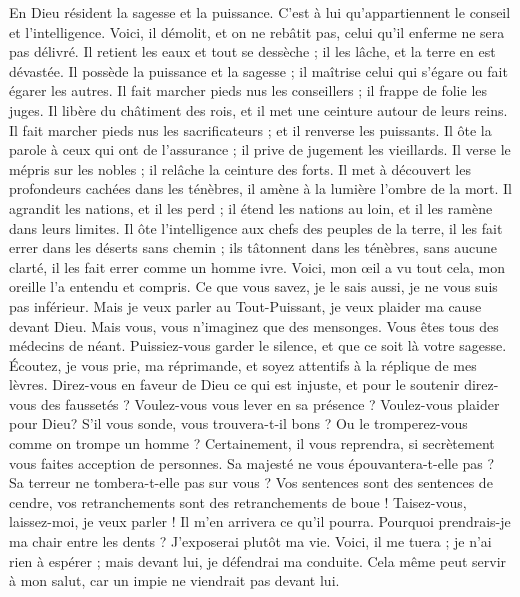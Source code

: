 \begin{multicols}{2}
En Dieu résident la sagesse et la puissance. C'est à lui qu'appartiennent le conseil et l'intelligence.
Voici, il démolit, et on ne rebâtit pas, celui qu'il enferme ne sera pas délivré.
Il retient les eaux et tout se dessèche ; il les lâche, et la terre en est dévastée.
Il possède la puissance et la sagesse ; il maîtrise celui qui s'égare ou fait égarer les autres.
Il fait marcher pieds nus les conseillers ; il frappe de folie les juges.
Il libère du châtiment des rois, et il met une ceinture autour de leurs reins.
Il fait marcher pieds nus les sacrificateurs ; et il renverse les puissants.
Il ôte la parole à ceux qui ont de l'assurance ; il prive de jugement les vieillards.
Il verse le mépris sur les nobles ; il relâche la ceinture des forts.
Il met à découvert les profondeurs cachées dans les ténèbres, il amène à la lumière l'ombre de la mort.
Il agrandit les nations, et il les perd ; il étend les nations au loin, et il les ramène dans leurs limites.
Il ôte l'intelligence aux chefs des peuples de la terre, il les fait errer dans les déserts sans chemin ;
ils tâtonnent dans les ténèbres, sans aucune clarté, il les fait errer comme un homme ivre.
\VerseOne{}Voici, mon œil a vu tout cela, mon oreille l'a entendu et compris.
Ce que vous savez, je le sais aussi, je ne vous suis pas inférieur.
Mais je veux parler au Tout-Puissant, je veux plaider ma cause devant Dieu.
Mais vous, vous n'imaginez que des mensonges. Vous êtes tous des médecins de néant.
Puissiez-vous garder le silence, et que ce soit là votre sagesse.
Écoutez, je vous prie, ma réprimande, et soyez attentifs à la réplique de mes lèvres.
Direz-vous en faveur de Dieu ce qui est injuste, et pour le soutenir direz-vous des faussetés ?
Voulez-vous vous lever en sa présence ? Voulez-vous plaider pour Dieu?
S'il vous sonde, vous trouvera-t-il bons ? Ou le tromperez-vous comme on trompe un homme ?
Certainement, il vous reprendra, si secrètement vous faites acception de personnes.
Sa majesté ne vous épouvantera-t-elle pas ? Sa terreur ne tombera-t-elle pas sur vous ?
Vos sentences sont des sentences de cendre, vos retranchements sont des retranchements de boue !
Taisez-vous, laissez-moi, je veux parler ! Il m'en arrivera ce qu'il pourra.
Pourquoi prendrais-je ma chair entre les dents ? J'exposerai plutôt ma vie.
Voici, il me tuera ; je n'ai rien à espérer ; mais devant lui, je défendrai ma conduite.
Cela même peut servir à mon salut, car un impie ne viendrait pas devant lui.

\end{multicols}
